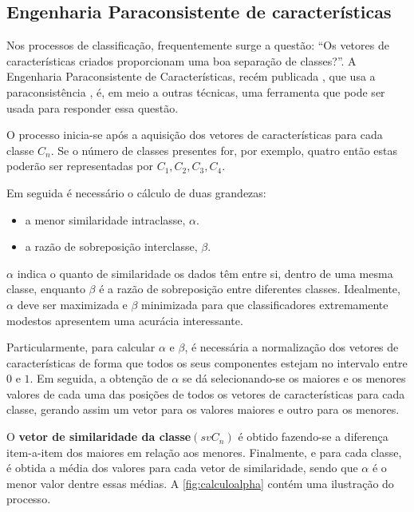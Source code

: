 			
	
		\subsection{Engenharia Paraconsistente de características}
			\par Nos processos de classificação, frequentemente surge a questão: ``Os vetores de características criados proporcionam uma boa separação de classes?''. A Engenharia Paraconsistente de Características, recém publicada \cite{8588433}, que usa a paraconsistência \cite{da1998elementos},  \cite{COSTA2000} é, em meio a outras técnicas, uma ferramenta que pode ser usada para responder essa questão.
			
			\par O processo inicia-se após a aquisição dos vetores de características para cada classe $C_n$. Se o número de classes presentes for, por exemplo, quatro então estas poderão ser representadas por $C_1, C_2, C_3, C_4$.
			\par Em seguida é necessário o cálculo de duas grandezas:
			
			\begin{itemize}
				\item a menor similaridade intraclasse, $\alpha$.
				\item a razão de sobreposição interclasse, $\beta$.
			\end{itemize}
	
			\par $\alpha$ indica o quanto de similaridade os dados têm entre si, dentro de uma mesma classe, enquanto $\beta$ é a razão de sobreposição entre diferentes classes. Idealmente, $\alpha$ deve ser maximizada e $\beta$ minimizada para que classificadores extremamente modestos apresentem uma acurácia interessante.
			
			\par Particularmente, para calcular $\alpha$ e $\beta$, é necessária a normalização dos vetores de características de forma que todos os seus componentes estejam no intervalo entre $0$ e $1$. Em seguida, a obtenção de $\alpha$ se dá selecionando-se os maiores e os menores valores de cada uma das posições de todos os vetores de características para cada classe, gerando assim um vetor para os valores maiores e outro para os menores.
			
			\par O \textbf{vetor de similaridade da classe}$(svC_n)$ é obtido fazendo-se a diferença item-a-item dos maiores em relação aos menores. Finalmente, e para cada classe, é obtida a média dos valores para cada vetor de similaridade, sendo que $\alpha$ é o menor valor dentre essas médias. A  \autoref{fig:calculoalpha} contém uma ilustração do processo.
	
